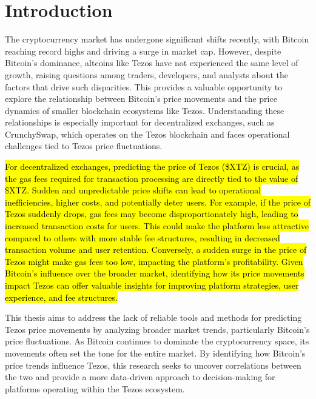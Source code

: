 
\section{Introduction}%

The cryptocurrency market has undergone significant shifts recently, with Bitcoin reaching record highs and driving a surge in market cap. However, despite Bitcoin's dominance, altcoins like Tezos have not experienced the same level of growth, raising questions among traders, developers, 
and analysts about the factors that drive such disparities. This provides a valuable opportunity to explore the relationship between Bitcoin's price movements and the price dynamics of smaller blockchain ecosystems like Tezos. Understanding these relationships is especially important for decentralized exchanges, such as CrunchySwap, which operates on the Tezos blockchain and faces operational challenges tied to Tezos price fluctuations.

\hl{For decentralized exchanges, predicting the price of Tezos (\$XTZ) is crucial, as the gas fees required for transaction processing are directly tied to the value of \$XTZ. 
Sudden and unpredictable price shifts can lead to operational inefficiencies, higher costs, and potentially deter users. For example, if the price of Tezos suddenly drops, gas fees may become disproportionately high, leading to increased transaction costs for users.
 This could make the platform less attractive compared to others with more stable fee structures, resulting in decreased transaction volume and user retention. Conversely, a sudden surge in the price of Tezos might make gas fees too low, impacting the platform's profitability. 
 Given Bitcoin’s influence over the broader market, identifying how its price movements impact Tezos can offer valuable insights for improving platform strategies, user experience, and fee structures.}

 This thesis aims to address the lack of reliable tools and methods for predicting Tezos price movements by analyzing broader market trends, particularly Bitcoin’s price fluctuations. As Bitcoin continues to dominate the cryptocurrency space, its movements often set the tone for the entire market. By identifying how Bitcoin's price trends influence Tezos, this research seeks to uncover correlations between the two and provide a more data-driven approach to decision-making for platforms operating within the Tezos ecosystem.

